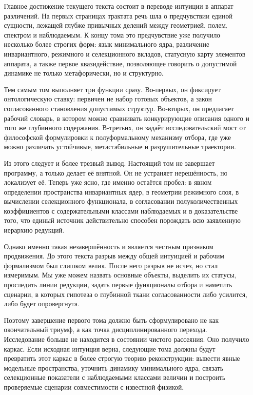 \documentclass[12pt,a4paper]{article}
\begin{document}
Главное достижение текущего текста состоит в переводе интуиции в аппарат различений. На первых страницах трактата речь шла о предчувствии единой сущности, лежащей глубже привычных делений между геометрией, полем, спектром и наблюдаемым. К концу тома это предчувствие уже получило несколько более строгих форм: язык минимального ядра, различение инвариантного, режимного и селекционного вкладов, статусную карту элементов аппарата, а также первое квазидействие, позволяющее говорить о допустимой динамике не только метафорически, но и структурно.

Тем самым том выполняет три функции сразу. Во-первых, он фиксирует онтологическую ставку: первичен не набор готовых объектов, а закон согласованного становления допустимых структур. Во-вторых, он предлагает рабочий словарь, в котором можно сравнивать конкурирующие описания одного и того же глубинного содержания. В-третьих, он задаёт исследовательский мост от философской формулировки к полуформальному механизму отбора, где уже можно различать устойчивые, метастабильные и разрушительные траектории.

Из этого следует и более трезвый вывод. Настоящий том не завершает программу, а только делает её внятной. Он не устраняет нерешённость, но локализует её. Теперь уже ясно, где именно остаётся пробел: в явном определении пространства инвариантных ядер, в геометрии режимного слоя, в вычислении селекционного функционала, в согласовании полуколичественных коэффициентов с содержательными классами наблюдаемых и в доказательстве того, что единый источник действительно способен порождать всю заявленную иерархию редукций.

Однако именно такая незавершённость и является честным признаком продвижения. До этого текста разрыв между общей интуицией и рабочим формализмом был слишком велик. После него разрыв не исчез, но стал измеримым. Мы уже можем назвать основные объекты, выделить их статусы, проследить линии редукции, задать первые функционалы отбора и наметить сценарии, в которых гипотеза о глубинной ткани согласованности либо усилится, либо будет опровергнута.

Поэтому завершение первого тома должно быть сформулировано не как окончательный триумф, а как точка дисциплинированного перехода. Исследование больше не находится в состоянии чистого рассеяния. Оно получило каркас. Если исходная интуиция верна, следующие тома должны будут превратить этот каркас в более строгую теорию реконструкции: вывести явные модельные пространства, уточнить динамику минимального ядра, связать селекционные показатели с наблюдаемыми классами величин и построить проверяемые сценарии совместимости с известной физикой.
\end{document}
